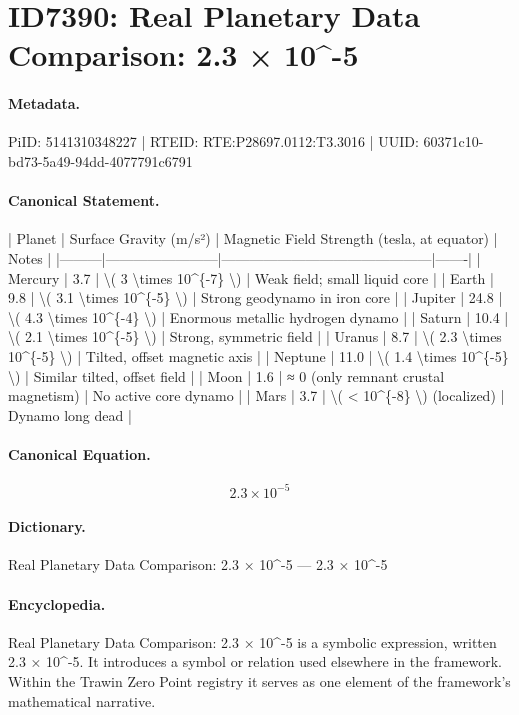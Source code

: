 \section*{ID7390: Real Planetary Data Comparison: 2.3 × 10\textasciicircum{}-5}
\paragraph{Metadata.}
PiID: 5141310348227 | RTEID: RTE:P28697.0112:T3.3016 | UUID: 60371c10-bd73-5a49-94dd-4077791c6791

\paragraph{Canonical Statement.}
| Planet | Surface Gravity (m/s²) | Magnetic Field Strength (tesla, at equator) | Notes | |---------|------------------------|---------------------------------------------|-------| | Mercury | 3.7 | \textbackslash{}( 3 \textbackslash{}times 10\textasciicircum{}\{-7\} \textbackslash{}) | Weak field; small liquid core | | Earth | 9.8 | \textbackslash{}( 3.1 \textbackslash{}times 10\textasciicircum{}\{-5\} \textbackslash{}) | Strong geodynamo in iron core | | Jupiter | 24.8 | \textbackslash{}( 4.3 \textbackslash{}times 10\textasciicircum{}\{-4\} \textbackslash{}) | Enormous metallic hydrogen dynamo | | Saturn | 10.4 | \textbackslash{}( 2.1 \textbackslash{}times 10\textasciicircum{}\{-5\} \textbackslash{}) | Strong, symmetric field | | Uranus | 8.7 | \textbackslash{}( 2.3 \textbackslash{}times 10\textasciicircum{}\{-5\} \textbackslash{}) | Tilted, offset magnetic axis | | Neptune | 11.0 | \textbackslash{}( 1.4 \textbackslash{}times 10\textasciicircum{}\{-5\} \textbackslash{}) | Similar tilted, offset field | | Moon | 1.6 | ≈ 0 (only remnant crustal magnetism) | No active core dynamo | | Mars | 3.7 | \textbackslash{}( < 10\textasciicircum{}\{-8\} \textbackslash{}) (localized) | Dynamo long dead |

\paragraph{Canonical Equation.}
\[
2.3 \times 10^{-5}
\]

\paragraph{Dictionary.}
Real Planetary Data Comparison: 2.3 × 10\textasciicircum{}-5 — 2.3 × 10\textasciicircum{}-5

\paragraph{Encyclopedia.}
Real Planetary Data Comparison: 2.3 × 10\textasciicircum{}-5 is a symbolic expression, written 2.3 × 10\textasciicircum{}-5. It introduces a symbol or relation used elsewhere in the framework. Within the Trawin Zero Point registry it serves as one element of the framework's mathematical narrative.
